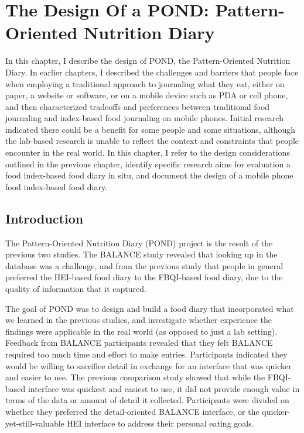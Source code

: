 
\chapter{The Design Of a POND: Pattern-Oriented Nutrition Diary}
\label{cha:cont3}
 

In this chapter, I describe the design of POND, the Pattern-Oriented Nutrition Diary. In earlier chapters, I described the challenges and barriers that people face when employing a traditional approach to journaling what they eat, either on paper, a website or software, or on a mobile device such as PDA or cell phone, and then characterized tradeoffs and preferences between traditional food journaling and index-based food journaling on mobile phones. Initial research indicated there could be a benefit for some people and some situations, although the lab-based research is unable to reflect the context and constraints that people encounter in the real world. In this chapter, I refer to the design considerations outlined in the previous chapter, identify specific research aims for evaluation a food index-based food diary in situ, and document the design of a mobile phone food index-based food diary. 

\section{Introduction}
The Pattern-Oriented Nutrition Diary (POND) project is the result of the previous two studies. The BALANCE study revealed that looking up in the database was a challenge, and from the previous study that people in general preferred the HEI-based food diary to the FBQI-based food diary, due to the quality of information that it captured. 

The goal of POND was to design and build a food diary that incorporated what we learned in the previous studies, and investigate whether experience the findings were applicable in the real world (as opposed to just a lab setting). Feedback from BALANCE participants revealed that they felt BALANCE required too much time and effort to make entries. Participants indicated they would be willing to sacrifice detail in exchange for an interface that was quicker and easier to use. The previous comparison study showed that while the FBQI-based interface was quickest and easiest to use, it did not provide enough value in terms of the data or amount of detail it collected. Participants were divided on whether they preferred the detail-oriented BALANCE interface, or the quicker-yet-still-valuable HEI interface to address their personal eating goals. 

